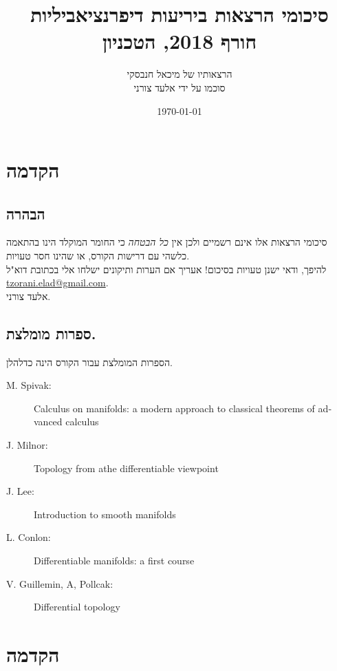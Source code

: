 \documentclass[a4paper,10pt,twoside,openany]{book}
\title{סיכומי הרצאות ביריעות דיפרנציאביליות \\ \large{חורף 2018, הטכניון}}
\author{הרצאותיו של מיכאל חנבסקי \\ \large סוכמו על ידי אלעד צורני}
\date{\today}
\begin{document}
\frontmatter
{}
\tableofcontents
\countlectures
\newpage

\chapter*{הקדמה}
 

\section*{הבהרה}

סיכומי הרצאות אלו אינם רשמיים ולכן אין
\emph{כל הבטחה}
כי החומר המוקלד הינו בהתאמה כלשהי עם דרישות הקורס, או שהינו חסר טעויות.
\\
להיפך, ודאי ישנן טעויות בסיכום! אעריך אם הערות ותיקונים ישלחו אלי בכתובת דוא"ל
\textenglish{\href{mailto:tzorani.elad@gmail.com}{tzorani.elad@gmail.com}}.\\
אלעד צורני.

\section*{ספרות מומלצת.}

הספרות המומלצת עבור הקורס הינה כדלהלן.

\begin{english}
\begin{description}
\item[M. Spivak:] Calculus on manifolds: a modern approach to classical theorems of advanced calculus

\item[J. Milnor:] Topology from athe differentiable viewpoint

\item[J. Lee:] Introduction to smooth manifolds

\item[L. Conlon:] Differentiable manifolds: a first course

\item[V. Guillemin, A, Pollcak:] Differential topology
\end{description}
\end{english}

\mainmatter

\chapter*{הקדמה}
\end{document}
